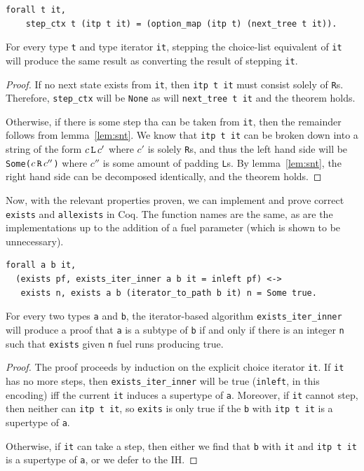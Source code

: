 \documentclass[a4paper,english]{lipics-v2019}
\renewcommand{\L}{{\tt L}\xspace}
\newcommand{\Ls}{{\tt L}s\xspace}
\newcommand{\R}{{\tt R}\xspace}
\newcommand{\Rs}{{\tt R}s\xspace}
\begin{document}
\begin{lemma}
\begin{small}\begin{verbatim}
forall t it,
    step_ctx t (itp t it) = (option_map (itp t) (next_tree t it)).
\end{verbatim}\end{small}
For every type \verb|t| and type iterator \verb|it|,
stepping the choice-list equivalent of \verb|it| will
produce the same result as converting the result of stepping
\verb|it|.
\end{lemma}
\begin{proof}
If no next state exists from \verb|it|, then
\verb|itp t it| must consist solely of \Rs. Therefore, \verb|step_ctx| will be \verb|None| as 
will \verb|next_tree t it| and the theorem holds. 

Otherwise, if there is some step tha can be taken from \verb|it|, then 
the remainder follows from lemma~\ref{lem:snt}. We know that \verb|itp t it| can
be broken down into a string of the form $c\,\L\,c'$ where $c'$ is solely \Rs, and thus
the left hand side will be \verb|Some(|$c\,\R\,c''$\verb|)| where $c''$ is some amount of 
padding \Ls. By lemma~\ref{lem:snt}, the right hand side can be decomposed identically, and the theorem holds.
\end{proof}

Now, with the relevant properties proven, we can implement and prove correct
\verb|exists| and \verb|allexists| in Coq. The function names are the
same, as are the implementations up to the addition of a fuel parameter (which
is shown to be unnecessary). 

\begin{lemma}
\label{lem:correxcst}
\begin{small}\begin{verbatim}
forall a b it, 
  (exists pf, exists_iter_inner a b it = inleft pf) <->
   exists n, exists a b (iterator_to_path b it) n = Some true.
\end{verbatim}\end{small}
For every two types \verb|a| and \verb|b|, the iterator-based algorithm
\verb|exists_iter_inner| will produce a proof that \verb|a| is a subtype
of \verb|b| if and only if there is an integer \verb|n| such that
 \verb|exists| given \verb|n| fuel runs producing true.
\end{lemma}
\begin{proof}

The proof proceeds by induction on the explicit choice iterator \verb|it|. If
\verb|it| has no more steps, then \verb|exists_iter_inner| will be true
(\verb|inleft|, in this encoding) iff the current \verb|it| induces a
supertype of \verb|a|. Moreover, if \verb|it| cannot step, then neither can
\verb|itp t it|, so \verb|exits| is only true if the \verb|b| with \verb|itp t it|
is a supertype of \verb|a|. 

Otherwise, if \verb|it| can take a step, then either we find that \verb|b|
with \verb|it| and \verb|itp t it| is a supertype of \verb|a|, or we defer to
the IH.
\end{proof}
\end{document}

